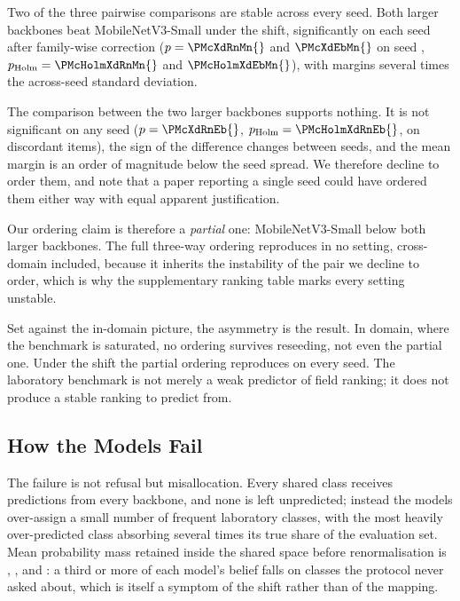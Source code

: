 \documentclass[runningheads]{llncs}
\begin{document}
Two of the three pairwise comparisons are stable across every seed. Both larger
backbones beat MobileNetV3-Small under the shift, significantly on each seed
after family-wise correction ($p = \PMcXdRnMn{}$ and $\PMcXdEbMn{}$ on seed
\SigSeed{}, $p_{\mathrm{Holm}} = \PMcHolmXdRnMn{}$ and $\PMcHolmXdEbMn{}$), with
margins several times the across-seed standard deviation.

The comparison between the two larger backbones supports nothing. It is not
significant on any seed ($p = \PMcXdRnEb{}$, $p_{\mathrm{Holm}} =
\PMcHolmXdRnEb{}$, on \NDiscXdRnEb{} discordant items), the sign of the
difference changes between seeds, and the mean margin is an order of magnitude
below the seed spread. We therefore decline to order them, and note that a paper
reporting a single seed could have ordered them either way with equal apparent
justification.

Our ordering claim is therefore a \emph{partial} one: MobileNetV3-Small below
both larger backbones. The full three-way ordering reproduces in no setting,
cross-domain included, because it inherits the instability of the pair we
decline to order, which is why the supplementary ranking table marks every
setting unstable.

Set against the in-domain picture, the asymmetry is the result. In domain, where
the benchmark is saturated, no ordering survives reseeding, not even the partial
one. Under the shift the partial ordering reproduces on every seed. The
laboratory benchmark is not merely a weak predictor of field ranking; it does
not produce a stable ranking to predict from.

\subsection{How the Models Fail}

The failure is not refusal but misallocation. Every shared class receives
predictions from every backbone, and none is left unpredicted; instead the
models over-assign a small number of frequent laboratory classes, with the most
heavily over-predicted class absorbing several times its true share of the
evaluation set. Mean probability mass retained inside the shared space before
renormalisation is \RetainedMassRn{}, \RetainedMassEb{}, and \RetainedMassMn{}:
a third or more of each model's belief falls on classes the protocol never asked
about, which is itself a symptom of the shift rather than of the mapping.

\end{document}
